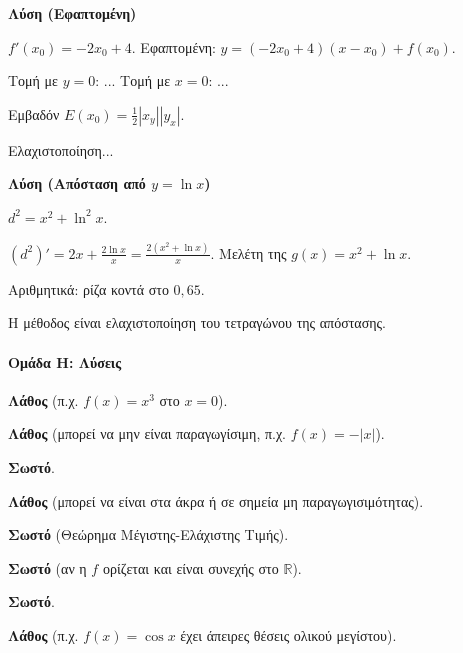 \documentclass[11pt,a4paper,modern]{FFExercises}
\begin{document}
\askhsh
\textbf{Λύση (Εφαπτομένη)}
\begin{alist}
    \item $f'(x_0) = -2x_0 + 4$. Εφαπτομένη: $y = (-2x_0+4)(x-x_0) + f(x_0)$.
    \item Τομή με $y=0$: ... Τομή με $x=0$: ...
    \item Εμβαδόν $E(x_0) = \frac{1}{2}|x_y||y_x|$.
    \item Ελαχιστοποίηση...
\end{alist}

\askhsh
\textbf{Λύση (Απόσταση από $y=\ln x$)}
\begin{alist}
    \item $d^2 = x^2 + \ln^2 x$.
    \item $(d^2)' = 2x + \frac{2\ln x}{x} = \frac{2(x^2 + \ln x)}{x}$. Μελέτη της $g(x) = x^2 + \ln x$.
    \item Αριθμητικά: ρίζα κοντά στο $0{,}65$.
    \item Η μέθοδος είναι ελαχιστοποίηση του τετραγώνου της απόστασης.
\end{alist}

\paragraph{Ομάδα Η: Λύσεις}

\askhsh
\begin{alist}
    \item \textbf{Λάθος} (π.χ. $f(x) = x^3$ στο $x=0$).
    \item \textbf{Λάθος} (μπορεί να μην είναι παραγωγίσιμη, π.χ. $f(x) = -|x|$).
    \item \textbf{Σωστό}.
    \item \textbf{Λάθος} (μπορεί να είναι στα άκρα ή σε σημεία μη παραγωγισιμότητας).
\end{alist}

\askhsh
\begin{alist}
    \item \textbf{Σωστό} (Θεώρημα Μέγιστης-Ελάχιστης Τιμής).
    \item \textbf{Σωστό} (αν η $f$ ορίζεται και είναι συνεχής στο $\mathbb{R}$).
    \item \textbf{Σωστό}.
    \item \textbf{Λάθος} (π.χ. $f(x) = \cos x$ έχει άπειρες θέσεις ολικού μεγίστου).
\end{alist}
\end{document}
